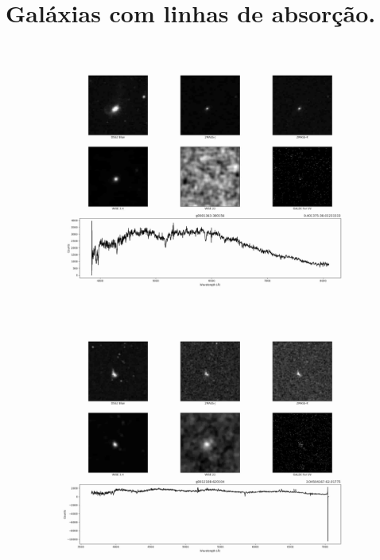 \chapter{Galáxias com linhas de absorção.}\label{app:abs}
\begin{figure}[H]
    \begin{center}
        \includegraphics[scale = 0.10]{figuras/1.jpg}
        \includegraphics[scale = 0.10]{figuras/2.jpg}

\end{center}
\end{figure}

